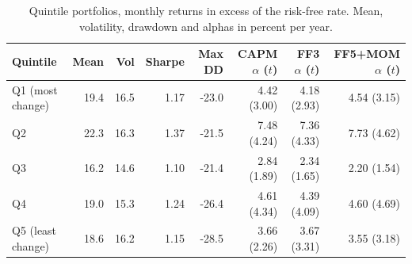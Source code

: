 \begin{table}[htbp]\centering\small
\caption{Quintile portfolios, monthly returns in excess of the risk-free rate. Mean, volatility, drawdown and alphas in percent per year.}\label{tab:quintiles}
\begin{tabular}{lrrrrrrr}\toprule
Quintile & Mean & Vol & Sharpe & Max DD & CAPM $\alpha$ ($t$) & FF3 $\alpha$ ($t$) & FF5+MOM $\alpha$ ($t$) \\ \midrule
Q1 (most change) & 19.4 & 16.5 & 1.17 & -23.0 & 4.42 (3.00) & 4.18 (2.93) & 4.54 (3.15) \\
Q2 & 22.3 & 16.3 & 1.37 & -21.5 & 7.48 (4.24) & 7.36 (4.33) & 7.73 (4.62) \\
Q3 & 16.2 & 14.6 & 1.10 & -21.4 & 2.84 (1.89) & 2.34 (1.65) & 2.20 (1.54) \\
Q4 & 19.0 & 15.3 & 1.24 & -26.4 & 4.61 (4.34) & 4.39 (4.09) & 4.60 (4.69) \\
Q5 (least change) & 18.6 & 16.2 & 1.15 & -28.5 & 3.66 (2.26) & 3.67 (3.31) & 3.55 (3.18) \\
\bottomrule\end{tabular}\end{table}
